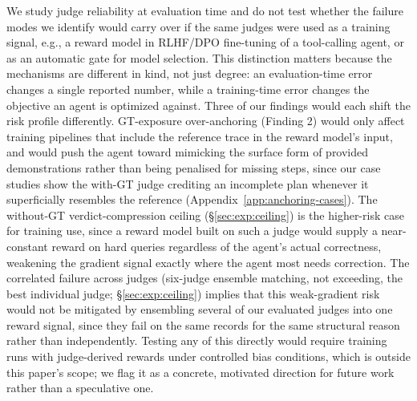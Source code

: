 We study judge reliability at evaluation time and do not test whether the failure modes we identify would carry over if the same judges were used as a training signal, e.g., a reward model in RLHF/DPO fine-tuning of a tool-calling agent, or as an automatic gate for model selection. This distinction matters because the mechanisms are different in kind, not just degree: an evaluation-time error changes a single reported number, while a training-time error changes the objective an agent is optimized against. Three of our findings would each shift the risk profile differently. GT-exposure over-anchoring (Finding 2) would only affect training pipelines that include the reference trace in the reward model's input, and would push the agent toward mimicking the surface form of provided demonstrations rather than being penalised for missing steps, since our case studies show the with-GT judge crediting an incomplete plan whenever it superficially resembles the reference (Appendix~\ref{app:anchoring-cases}). The without-GT verdict-compression ceiling (\S\ref{sec:exp:ceiling}) is the higher-risk case for training use, since a reward model built on such a judge would supply a near-constant reward on hard queries regardless of the agent's actual correctness, weakening the gradient signal exactly where the agent most needs correction. The correlated failure across judges (six-judge ensemble matching, not exceeding, the best individual judge; \S\ref{sec:exp:ceiling}) implies that this weak-gradient risk would not be mitigated by ensembling several of our evaluated judges into one reward signal, since they fail on the same records for the same structural reason rather than independently. Testing any of this directly would require training runs with judge-derived rewards under controlled bias conditions, which is outside this paper's scope; we flag it as a concrete, motivated direction for future work rather than a speculative one.
